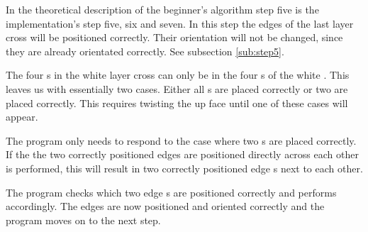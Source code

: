 In the theoretical description of the beginner's algorithm step five is the implementation's step five, six and seven. 
In this step the edges of the last layer cross will be positioned correctly. Their orientation will not be changed, since they are already orientated correctly. See subsection \ref{sub:step5}.

The four \cpiece{}s in the white layer cross can only be in the four \cubicle{}s of the white \face{}. This leaves us with essentially two cases. Either all \cpiece{}s are placed correctly or two are placed correctly. This requires twisting the up face until one of these cases will appear.

The program only needs to respond to the case where two \cpiece{}s are placed correctly. 
If the the two correctly positioned edges are positioned directly across each other  is performed, this will result in two correctly positioned edge \cubie{}s next to each other.

The program checks which two edge \cpiece{}s are positioned correctly and performs  accordingly. 
The edges are now positioned and oriented correctly and the program moves on to the next step.